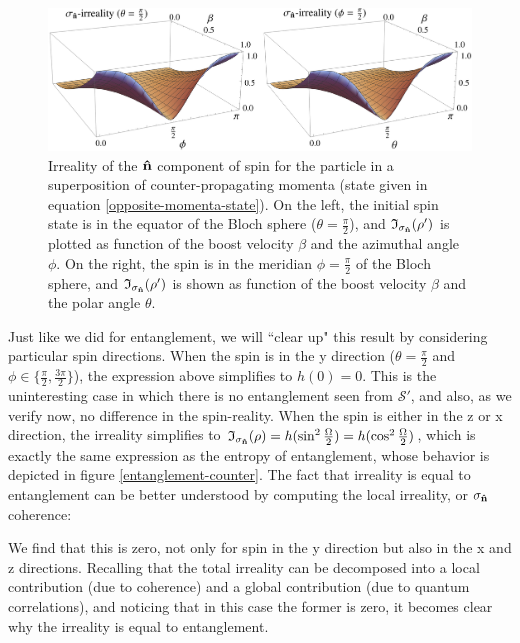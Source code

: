 \documentclass[12pt,a4paper,notitlepage]{report}
\begin{document}
\begin{figure}[t]
  \centering
  \includegraphics[scale=.3]{../Figuras/improved/spin-irreality-counter-IMPROVED.eps}
  \captionsetup{font=footnotesize, margin=8pt}
  \caption{Irreality of the $\vu{n}$ component of spin for the particle in a superposition of counter-propagating momenta (state given in equation \eqref{opposite-momenta-state}). On the left, the initial spin state is in the equator of the Bloch sphere ($\theta = \tfrac{\pi}{2}$), and $\mathfrak{I}_{\sigma_{\vu{n}}}(\rho')$ is plotted as function of the boost velocity $\beta$ and the azimuthal angle $\phi$. On the right, the spin is in the meridian $\phi = \tfrac{\pi}{2}$ of the Bloch sphere, and $\mathfrak{I}_{\sigma_{\vu{n}}}(\rho')$ is shown as function of the boost velocity $\beta$ and the polar angle $\theta$.}
  \label{spin-irreality-counter}
\end{figure}

Just like we did for entanglement, we will ``clear up" this result by considering particular spin directions. When the spin is in the y direction ($\theta = \frac{\pi}{2}$ and $\phi \in \{ \frac{\pi}{2}, \frac{3 \pi}{2}\}$), the expression above simplifies to $h(0) = 0$. This is the uninteresting case in which there is no entanglement seen from $\mathcal{S}'$, and also, as we verify now, no difference in the spin-reality. When the spin is either in the z or x direction, the irreality simplifies to $\mathfrak{I}_{\sigma_{\vu{n}}}(\rho) = h(\sin^2\tfrac{\Omega}{2}) = h(\cos^2\tfrac{\Omega}{2})$, which is exactly the same expression as the entropy of entanglement, whose behavior is depicted in figure \ref{entanglement-counter}. The fact that irreality is equal to entanglement can be better understood by computing the local irreality, or $\sigma_{\vu{n}}$ coherence:

%
We find that this is zero, not only for spin in the y direction but also in the x and z directions. Recalling that the total irreality can be decomposed into a local contribution (due to coherence) and a global contribution (due to quantum correlations), and noticing that in this case the former is zero, it becomes clear why the irreality is equal to entanglement.
\end{document}
